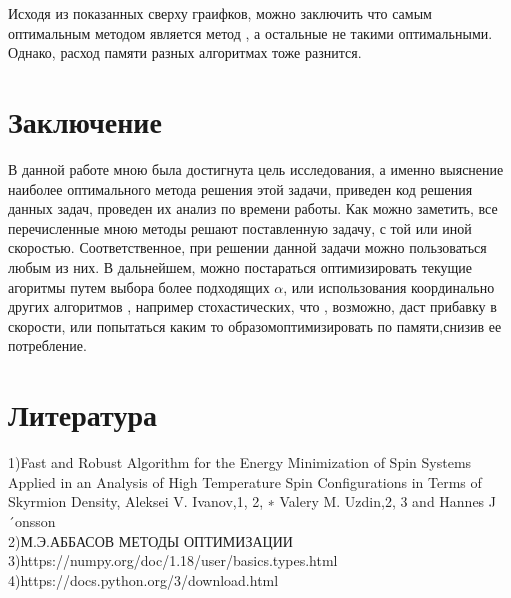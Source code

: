 \documentclass[ 12pt,x11names]{article}
\begin{document}
 \\

 \\
Исходя из показанных сверху граифков, можно заключить что самым оптимальным методом является метод      , а остальные не такими оптимальными.
Однако, расход памяти  разных алгоритмах тоже разнится.
 \newpage
    \section{Заключение}
    В данной работе мною была достигнута цель исследования, а именно выяснение наиболее оптимального метода решения этой задачи, приведен  код решения данных задач, проведен их анализ по времени работы.
    Как можно заметить, все перечисленные мною методы решают поставленную задачу, с той или иной скоростью. Соответственное, при решении данной задачи можно пользоваться любым из них.
    В дальнейшем, можно постараться оптимизировать текущие агоритмы  путем выбора более подходящих $\alpha$, или использования координально других алгоритмов , например стохастических, что , возможно, даст прибавку в скорости, или попытаться каким то образомоптимизировать по памяти,снизив ее потребление.
\newpage
\section{Литература}
1)Fast and Robust Algorithm for the Energy Minimization of Spin Systems Applied in
an Analysis of High Temperature Spin Configurations in Terms of Skyrmion Density, Aleksei V. Ivanov,1, 2, ∗ Valery M. Uzdin,2, 3 and Hannes J´onsson\\
2)М.Э.АББАСОВ
МЕТОДЫ ОПТИМИЗАЦИИ\\
3)https://numpy.org/doc/1.18/user/basics.types.html\\
4)https://docs.python.org/3/download.html\\
\end{document}
